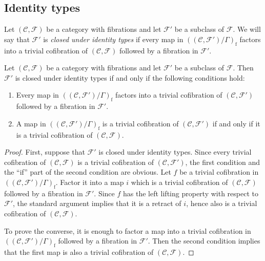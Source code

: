 \documentclass[reqno]{amsart}
\theoremstyle{definition}
\theoremstyle{remark}
\newcommand{\fs}[1]{\mathrm{#1}}
\newcommand{\scat}[1]{\mathcal{#1}}
\newcommand{\Fib}{\mathcal{F}}
\numberwithin{figure}{section}
\begin{document}
\subsection{Identity types}

Let $(\scat{C},\Fib)$ be a category with fibrations and let $\Fib'$ be a subclass of $\Fib$.
We will say that $\Fib'$ is \emph{closed under identity types} if every map in $((\scat{C},\Fib')/\Gamma)_\fs{f}$ factors into a trivial cofibration of $(\scat{C},\Fib)$ followed by a fibration in $\Fib'$.

\begin{lem}[subfib]
Let $(\scat{C},\Fib)$ be a category with fibrations and let $\Fib'$ be a subclass of $\Fib$.
Then $\Fib'$ is closed under identity types if and only if the following conditions hold:
\begin{enumerate}
\item \label{it:subfib-factor} Every map in $((\scat{C},\Fib')/\Gamma)_\fs{f}$ factors into a trivial cofibration of $(\scat{C},\Fib')$ followed by a fibration in $\Fib'$.
\item \label{it:subfib-we} A map in $((\scat{C},\Fib')/\Gamma)_\fs{f}$ is a trivial cofibration of $(\scat{C},\Fib')$ if and only if it is a trivial cofibration of $(\scat{C},\Fib)$.
\end{enumerate}
\end{lem}
\begin{proof}
First, suppose that $\Fib'$ is closed under identity types.
Since every trivial cofibration of $(\scat{C},\Fib)$ is a trivial cofibration of $(\scat{C},\Fib')$, the first condition and the ``if'' part of the second condition are obvious.
Let $f$ be a trivial cofibration in $((\scat{C},\Fib')/\Gamma)_\fs{f}$.
Factor it into a map $i$ which is a trivial cofibration of $(\scat{C},\Fib)$ followed by a fibration in $\Fib'$.
Since $f$ has the left lifting property with respect to $\Fib'$, the standard argument implies that it is a retract of $i$, hence also is a trivial cofibration of $(\scat{C},\Fib)$.

To prove the converse, it is enough to factor a map into a trivial cofibration in $((\scat{C},\Fib')/\Gamma)_\fs{f}$ followed by a fibration in $\Fib'$.
Then the second condition implies that the first map is also a trivial cofibration of $(\scat{C},\Fib)$.
\end{proof}
\end{document}
